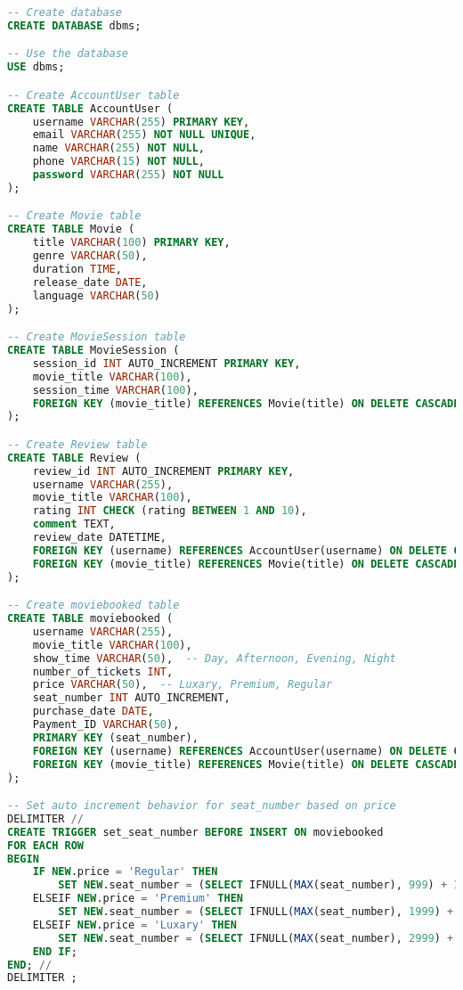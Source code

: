 \documentclass[a4paper,12pt]{article}  %
\begin{document}
\begin{lstlisting}[caption={SQL Database Creation for Movie Management System}, label=list:sql, language=SQL, frame=single, basicstyle=\ttfamily\small, keywordstyle=\color{brown}, commentstyle=\color{gray}, stringstyle=\color{blue}]
-- Create database
CREATE DATABASE dbms;

-- Use the database
USE dbms;

-- Create AccountUser table
CREATE TABLE AccountUser (
    username VARCHAR(255) PRIMARY KEY,
    email VARCHAR(255) NOT NULL UNIQUE,
    name VARCHAR(255) NOT NULL,
    phone VARCHAR(15) NOT NULL,
    password VARCHAR(255) NOT NULL
);

-- Create Movie table
CREATE TABLE Movie (
    title VARCHAR(100) PRIMARY KEY,
    genre VARCHAR(50),
    duration TIME,
    release_date DATE,
    language VARCHAR(50)
);

-- Create MovieSession table
CREATE TABLE MovieSession (
    session_id INT AUTO_INCREMENT PRIMARY KEY,
    movie_title VARCHAR(100),
    session_time VARCHAR(100),
    FOREIGN KEY (movie_title) REFERENCES Movie(title) ON DELETE CASCADE
);

-- Create Review table
CREATE TABLE Review (
    review_id INT AUTO_INCREMENT PRIMARY KEY,
    username VARCHAR(255),
    movie_title VARCHAR(100),
    rating INT CHECK (rating BETWEEN 1 AND 10),
    comment TEXT,
    review_date DATETIME,
    FOREIGN KEY (username) REFERENCES AccountUser(username) ON DELETE CASCADE,
    FOREIGN KEY (movie_title) REFERENCES Movie(title) ON DELETE CASCADE
);

-- Create moviebooked table
CREATE TABLE moviebooked (
    username VARCHAR(255),
    movie_title VARCHAR(100),
    show_time VARCHAR(50),  -- Day, Afternoon, Evening, Night
    number_of_tickets INT,
    price VARCHAR(50),  -- Luxary, Premium, Regular
    seat_number INT AUTO_INCREMENT,
    purchase_date DATE,
    Payment_ID VARCHAR(50),
    PRIMARY KEY (seat_number),
    FOREIGN KEY (username) REFERENCES AccountUser(username) ON DELETE CASCADE,
    FOREIGN KEY (movie_title) REFERENCES Movie(title) ON DELETE CASCADE
);

-- Set auto increment behavior for seat_number based on price
DELIMITER //
CREATE TRIGGER set_seat_number BEFORE INSERT ON moviebooked
FOR EACH ROW
BEGIN
    IF NEW.price = 'Regular' THEN
        SET NEW.seat_number = (SELECT IFNULL(MAX(seat_number), 999) + 1 FROM moviebooked WHERE price = 'Regular');
    ELSEIF NEW.price = 'Premium' THEN
        SET NEW.seat_number = (SELECT IFNULL(MAX(seat_number), 1999) + 1 FROM moviebooked WHERE price = 'Premium');
    ELSEIF NEW.price = 'Luxary' THEN
        SET NEW.seat_number = (SELECT IFNULL(MAX(seat_number), 2999) + 1 FROM moviebooked WHERE price = 'Luxary');
    END IF;
END; //
DELIMITER ;


\end{lstlisting}
\end{document}
